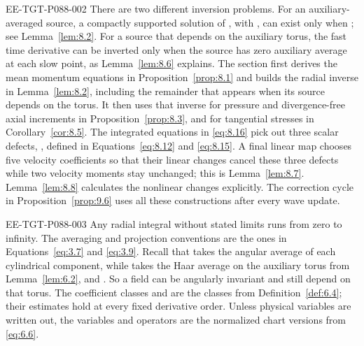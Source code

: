 \begin{EESegment}{EE-TGT-P088-002}
There are two different inversion problems. For an auxiliary-averaged source, a compactly supported
solution  of
, with
, can exist only when
; see Lemma~\ref{lem:8.2}. For a source that depends on the
auxiliary torus, the fast time derivative can be inverted only when the source has zero auxiliary
average at each slow point, as Lemma~\ref{lem:8.6} explains. The section first derives the mean
momentum equations in Proposition~\ref{prop:8.1} and builds the radial inverse in
Lemma~\ref{lem:8.2}, including the remainder that appears when its source depends on the torus. It
then uses that inverse for pressure and divergence-free axial increments in
Proposition~\ref{prop:8.3}, and for tangential stresses in
Corollary~\ref{cor:8.5}. The integrated equations in \eqref{eq:8.16} pick out three scalar defects,
, defined in Equations~\eqref{eq:8.12}
and \eqref{eq:8.15}. A final linear map chooses five velocity coefficients so that their linear
changes cancel these three defects while two velocity moments stay unchanged; this is
Lemma~\ref{lem:8.7}. Lemma~\ref{lem:8.8} calculates the nonlinear changes explicitly. The correction
cycle in Proposition~\ref{prop:9.6} uses all these constructions after every wave update.
\end{EESegment}

\begin{EESegment}{EE-TGT-P088-003}
Any radial integral without stated limits runs from zero to infinity. The averaging and projection
conventions are the ones in Equations~\eqref{eq:3.7} and \eqref{eq:3.9}. Recall that
 takes the angular average of each cylindrical
component, while  takes the Haar average on the
auxiliary torus from Lemma~\ref{lem:6.2}, and
. So a field can be angularly invariant and still
depend on that torus. The coefficient classes  and
 are the classes from Definition~\ref{def:6.4}; their estimates
hold at every fixed derivative order. Unless physical variables are written out, the variables and
operators are the normalized chart versions from \eqref{eq:6.6}.
\end{EESegment}

